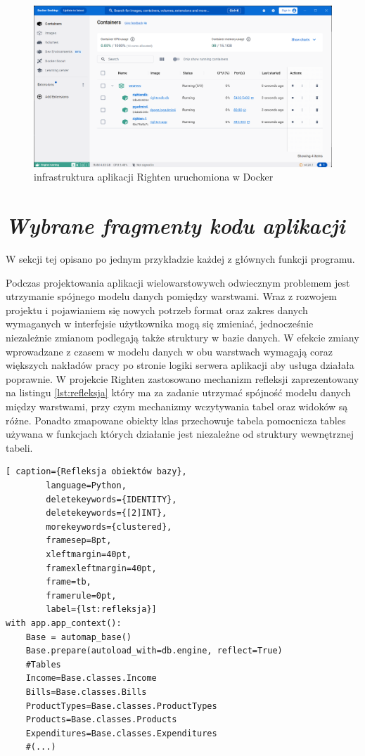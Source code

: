 \documentclass[a4paper,10pt, twoside]{report}
\newcommand{\customstylesection}[1]{\textbf{\textit{#1}}}
\begin{document}
\begin{large}
\begin{figure}[H]           %
    \centering
    \includegraphics[width=12cm]{figures/Righten_environment_docker.png}
    \caption{infrastruktura aplikacji Righten uruchomiona w Docker}
    \label{fig:rightenenvironmentdocker}
\end{figure}

\section{\customstylesection{Wybrane fragmenty kodu aplikacji}}
{W sekcji tej opisano po jednym przykładzie każdej z głównych funkcji programu.}

{Podczas projektowania aplikacji wielowarstowywch odwiecznym problemem jest 
utrzymanie spójnego modelu danych pomiędzy warstwami. Wraz z rozwojem projektu i
 pojawianiem się nowych potrzeb format oraz zakres danych wymaganych w 
interfejsie użytkownika mogą się zmieniać, jednocześnie niezależnie zmianom 
podlegają także struktury w bazie danych. W efekcie zmiany wprowadzane z czasem 
w modelu danych w obu warstwach wymagają coraz większych nakładów pracy po 
stronie logiki serwera aplikacji aby usługa działała poprawnie. W projekcie 
Righten zastosowano mechanizm refleksji \cite{refleksja} zaprezentowany na 
listingu \ref*{lst:refleksja} który ma za zadanie utrzymać spójność modelu 
danych między warstwami, przy czym mechanizmy wczytywania tabel oraz widoków są 
różne. Ponadto zmapowane obiekty klas przechowuje tabela pomocnicza tables 
używana w funkcjach których działanie jest niezależne od struktury wewnętrznej 
tabeli.}

\begin{minipage}{\textwidth}
    \begin{lstlisting}[ caption={Refleksja obiektów bazy},
        language=Python,
        deletekeywords={IDENTITY},
        deletekeywords={[2]INT},
        morekeywords={clustered},
        framesep=8pt,
        xleftmargin=40pt,
        framexleftmargin=40pt,
        frame=tb,
        framerule=0pt,
        label={lst:refleksja}]
with app.app_context():
    Base = automap_base() 
    Base.prepare(autoload_with=db.engine, reflect=True)
    #Tables
    Income=Base.classes.Income
    Bills=Base.classes.Bills
    ProductTypes=Base.classes.ProductTypes
    Products=Base.classes.Products
    Expenditures=Base.classes.Expenditures
    #(...)


\end{lstlisting}
\end{minipage}
\end{large}
\end{document}
